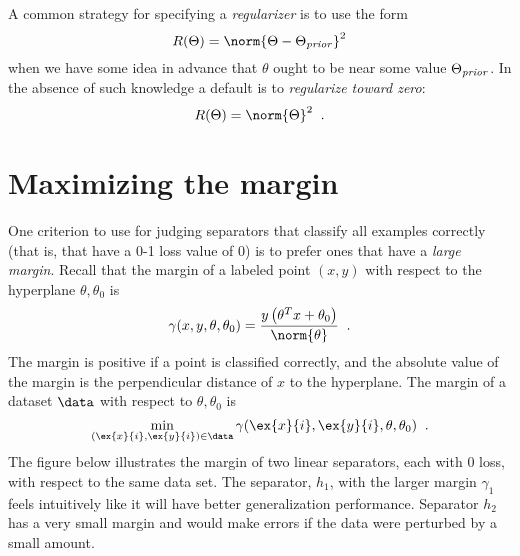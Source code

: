 A common strategy for specifying a \emph{regularizer} is to use the form
\[ R(\Theta) = \norm{\Theta - \Theta_{\it prior}}^2 \]
when we have some idea in advance that $\theta$ ought to be near some
value $\Theta_{\it prior}$.  
In the absence of such knowledge a default is
to {\em regularize toward zero}:
\[ R(\Theta) = \norm{\Theta}^2\;\;. \]

\section{Maximizing the margin}
One criterion to use for judging separators that classify all
examples correctly (that is, that have a 0-1 loss value of 0) is to
prefer ones that have a {\em large margin}.
Recall that the margin of a labeled point $(x,y)$
with respect to the hyperplane $\theta, \theta_0$ is
\[ \gamma(x,y,\theta,\theta_0) = \frac{y\left(\theta^Tx+\theta_0\right)}
{\norm{\theta}} \;\;.\]
The margin is positive if a point is classified correctly, and the
absolute value of the margin is the perpendicular distance of $x$ to the
hyperplane. The margin of a dataset $\data$ with respect to
$\theta,\theta_0$ is
\[ 
  \min_{(\ex{x}{i},\ex{y}{i})\in \data}
  \gamma(\ex{x}{i},\ex{y}{i},\theta,\theta_0)\;\;.
\]
The figure below illustrates the margin of two linear separators, each
with 0 loss, with respect to the same data set.  The separator, $h_1$,
with the larger margin $\gamma_1$ feels intuitively like it will have
better generalization performance.  Separator $h_2$ has a very small
margin and would make errors if the data were perturbed by a small
amount.  

\begin{center}
\end{center}

